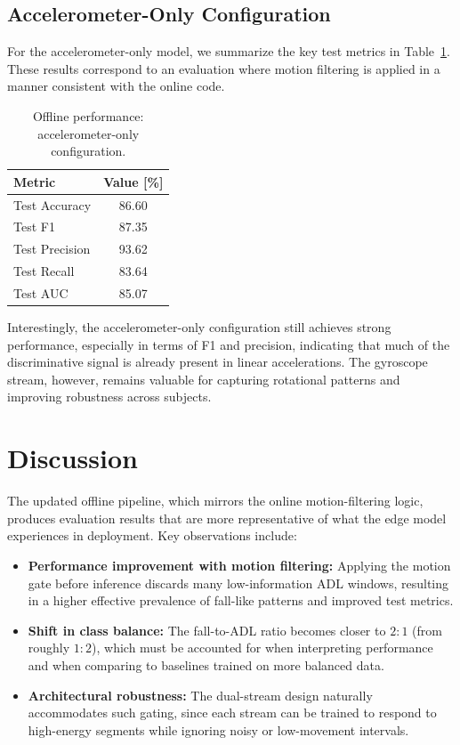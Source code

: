 \subsection{Accelerometer-Only Configuration}

For the accelerometer-only model, we summarize the key test metrics in Table~\ref{tab:acc_only}. These results correspond to an evaluation where motion filtering is applied in a manner consistent with the online code.

\begin{table}[h]
    \centering
    \caption{Offline performance: accelerometer-only configuration.}
    \label{tab:acc_only}
    \begin{tabular}{lc}
        \toprule
        Metric & Value [\%] \\
        \midrule
        Test Accuracy    & 86.60 \\
        Test F1          & 87.35 \\
        Test Precision   & 93.62 \\
        Test Recall      & 83.64 \\
        Test AUC         & 85.07 \\
        \bottomrule
    \end{tabular}
\end{table}

Interestingly, the accelerometer-only configuration still achieves strong performance, especially in terms of F1 and precision, indicating that much of the discriminative signal is already present in linear accelerations. The gyroscope stream, however, remains valuable for capturing rotational patterns and improving robustness across subjects.

\section{Discussion}

The updated offline pipeline, which mirrors the online motion-filtering logic, produces evaluation results that are more representative of what the edge model experiences in deployment. Key observations include:
\begin{itemize}
    \item \textbf{Performance improvement with motion filtering:} Applying the motion gate before inference discards many low-information ADL windows, resulting in a higher effective prevalence of fall-like patterns and improved test metrics.
    \item \textbf{Shift in class balance:} The fall-to-ADL ratio becomes closer to $2:1$ (from roughly $1:2$), which must be accounted for when interpreting performance and when comparing to baselines trained on more balanced data.
    \item \textbf{Architectural robustness:} The dual-stream design naturally accommodates such gating, since each stream can be trained to respond to high-energy segments while ignoring noisy or low-movement intervals.
\end{itemize}

